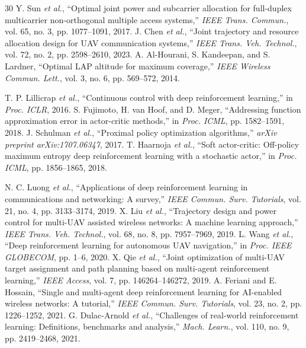 \documentclass[journal]{IEEEtran}
\begin{document}
\begin{thebibliography}{30}
 Y. Sun \textit{et al.}, ``Optimal joint power and subcarrier allocation for full-duplex multicarrier non-orthogonal multiple access systems,'' \textit{IEEE Trans. Commun.}, vol. 65, no. 3, pp. 1077--1091, 2017.
 J. Chen \textit{et al.}, ``Joint trajectory and resource allocation design for UAV communication systems,'' \textit{IEEE Trans. Veh. Technol.}, vol. 72, no. 2, pp. 2598--2610, 2023.
 A. Al-Hourani, S. Kandeepan, and S. Lardner, ``Optimal LAP altitude for maximum coverage,'' \textit{IEEE Wireless Commun. Lett.}, vol. 3, no. 6, pp. 569--572, 2014.

 T. P. Lillicrap \textit{et al.}, ``Continuous control with deep reinforcement learning,'' in \textit{Proc. ICLR}, 2016.
 S. Fujimoto, H. van Hoof, and D. Meger, ``Addressing function approximation error in actor-critic methods,'' in \textit{Proc. ICML}, pp. 1582--1591, 2018.
 J. Schulman \textit{et al.}, ``Proximal policy optimization algorithms,'' \textit{arXiv preprint arXiv:1707.06347}, 2017.
 T. Haarnoja \textit{et al.}, ``Soft actor-critic: Off-policy maximum entropy deep reinforcement learning with a stochastic actor,'' in \textit{Proc. ICML}, pp. 1856--1865, 2018.

 N. C. Luong \textit{et al.}, ``Applications of deep reinforcement learning in communications and networking: A survey,'' \textit{IEEE Commun. Surv. Tutorials}, vol. 21, no. 4, pp. 3133--3174, 2019.
 X. Liu \textit{et al.}, ``Trajectory design and power control for multi-UAV assisted wireless networks: A machine learning approach,'' \textit{IEEE Trans. Veh. Technol.}, vol. 68, no. 8, pp. 7957--7969, 2019.
 L. Wang \textit{et al.}, ``Deep reinforcement learning for autonomous UAV navigation,'' in \textit{Proc. IEEE GLOBECOM}, pp. 1--6, 2020.
 X. Qie \textit{et al.}, ``Joint optimization of multi-UAV target assignment and path planning based on multi-agent reinforcement learning,'' \textit{IEEE Access}, vol. 7, pp. 146264--146272, 2019.
 A. Feriani and E. Hossain, ``Single and multi-agent deep reinforcement learning for AI-enabled wireless networks: A tutorial,'' \textit{IEEE Commun. Surv. Tutorials}, vol. 23, no. 2, pp. 1226--1252, 2021.
 G. Dulac-Arnold \textit{et al.}, ``Challenges of real-world reinforcement learning: Definitions, benchmarks and analysis,'' \textit{Mach. Learn.}, vol. 110, no. 9, pp. 2419--2468, 2021.


\end{thebibliography}
\end{document}
